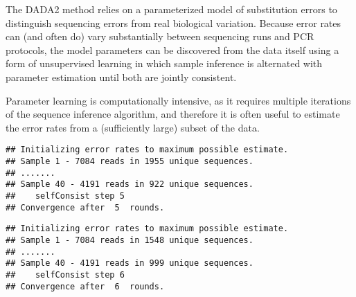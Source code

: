 The DADA2 method relies on a parameterized model of substitution
errors to distinguish sequencing errors from real biological
variation. Because error rates can (and often do) vary substantially
between sequencing runs and PCR protocols, the model parameters can be
discovered from the data itself using a form of unsupervised learning
in which sample inference is alternated with parameter estimation
until both are jointly consistent.

Parameter learning is computationally intensive, as it requires
multiple iterations of the sequence inference algorithm, and therefore
it is often useful to estimate the error rates from a (sufficiently
large) subset of the data.

\begin{knitrout}
\color{fgcolor}\begin{kframe}
\begin{alltt}
 \hlkwb{<-} \hlstd{(derepFs[}\hlopt{:}\hlstd{],} \hlstd{=}\hlstd{,} \hlstd{=}\hlstd{)}
\end{alltt}


{\ttfamily\noindent\itshape\color{messagecolor}{\#\# Initial error matrix unspecified. Error rates will be initialized to the maximum possible estimate from this data.}}\begin{verbatim}
## Initializing error rates to maximum possible estimate.
## Sample 1 - 7084 reads in 1955 unique sequences.
## .......
## Sample 40 - 4191 reads in 922 unique sequences.
##    selfConsist step 5 
## Convergence after  5  rounds.
\end{verbatim}
\begin{alltt}
 \hlkwb{<-} \hlstd{(derepRs[}\hlopt{:}\hlstd{],} \hlstd{=}\hlstd{,} \hlstd{=}\hlstd{)}
\end{alltt}


{\ttfamily\noindent\itshape\color{messagecolor}{\#\# Initial error matrix unspecified. Error rates will be initialized to the maximum possible estimate from this data.}}\begin{verbatim}
## Initializing error rates to maximum possible estimate.
## Sample 1 - 7084 reads in 1548 unique sequences.
## .......
## Sample 40 - 4191 reads in 999 unique sequences.
##    selfConsist step 6 
## Convergence after  6  rounds.
\end{verbatim}
\end{kframe}
\end{knitrout}

